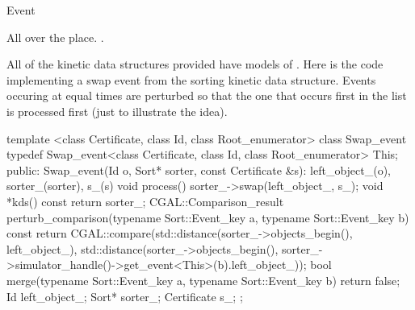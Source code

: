 \begin{ccRefConcept}{Event}

\ccHasModels

All over the place. .

\ccSeeAlso


\ccExample

All of the kinetic data structures provided have models of
\ccRefName. Here is the code implementing a swap event from the
sorting kinetic data structure. Events occuring at equal times are
perturbed so that the one that occurs first in the list is processed
first (just to illustrate the idea).

\begin{ccExampleCode}
template <class Certificate, class Id, class Root_enumerator> 
class Swap_event {
  typedef Swap_event<class Certificate, class Id, class Root_enumerator> This;
public:
  Swap_event(Id o, Sort* sorter, 
	     const Certificate &s): left_object_(o), 
                                    sorter_(sorter), 
                                    s_(s){}
  void process(){
    sorter_->swap(left_object_, s_);
  }
  void *kds() const {return sorter_;}
  CGAL::Comparison_result perturb_comparison(typename Sort::Event_key a, typename Sort::Event_key b) const {
    return CGAL::compare(std::distance(sorter_->objects_begin(), left_object_),
                         std::distance(sorter_->objects_begin(),
			               sorter_->simulator_handle()->get_event<This>(b).left_object_));
  }
  bool merge(typename Sort::Event_key a, typename Sort::Event_key b) {
    return false;
  }
  Id left_object_; 
  Sort* sorter_; 
  Certificate s_;
};
\end{ccExampleCode}


\end{ccRefConcept}


